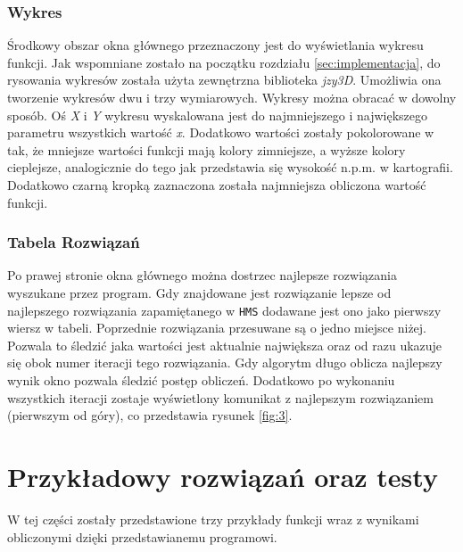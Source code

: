 \documentclass[10pt, a4paper]{article}
\begin{document}
\subsubsection{Wykres}
\label{subsubsec:wykres}
Środkowy obszar okna głównego przeznaczony jest do wyświetlania wykresu funkcji. Jak wspomniane zostało na początku rozdziału \ref{sec:implementacja}, do rysowania wykresów została użyta zewnętrzna biblioteka {\em jzy3D}. Umożliwia ona tworzenie wykresów dwu i trzy wymiarowych.  Wykresy można obracać w dowolny sposób. Oś {\em X} i {\em Y} wykresu wyskalowana jest do najmniejszego i największego parametru wszystkich wartość {\em x}. Dodatkowo wartości zostały pokolorowane w tak, że mniejsze wartości funkcji mają kolory zimniejsze, a wyższe kolory cieplejsze, analogicznie do tego jak przedstawia się wysokość n.p.m. w kartografii. Dodatkowo czarną kropką zaznaczona została najmniejsza obliczona wartość funkcji. 

\subsubsection{Tabela Rozwiązań}
\label{subsubsec:rozwiazania}
Po prawej stronie okna głównego można dostrzec najlepsze rozwiązania wyszukane przez program. Gdy znajdowane jest rozwiązanie lepsze od najlepszego rozwiązania zapamiętanego w {\tt HMS} dodawane jest ono jako pierwszy wiersz w tabeli. Poprzednie rozwiązania przesuwane są o jedno miejsce niżej. Pozwala to śledzić jaka wartości jest aktualnie największa oraz od razu ukazuje się obok numer iteracji tego rozwiązania. Gdy algorytm długo oblicza najlepszy wynik okno pozwala śledzić postęp obliczeń. Dodatkowo po wykonaniu wszystkich iteracji zostaje wyświetlony komunikat z najlepszym rozwiązaniem (pierwszym od góry), co przedstawia rysunek \ref{fig:3}.

\section{Przykładowy rozwiązań oraz testy}
\label{sec:przyklady}
W tej części zostały przedstawione trzy przykłady funkcji wraz z wynikami obliczonymi dzięki przedstawianemu programowi. 
\end{document}
